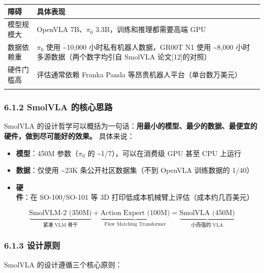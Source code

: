 \documentclass[
  chinese,
]{ctexart}
\providecommand{\tightlist}{%
  \setlength{\itemsep}{0pt}\setlength{\parskip}{0pt}}
\begin{document}
\begin{center}
\begin{tabular}{@{}>{\raggedright\arraybackslash}p{} >{\raggedright\arraybackslash}p{}@{}}
\toprule\noalign{}
障碍 & 具体表现 \\
\midrule\noalign{}
模型规模大 & OpenVLA 7B、\(\pi_0\) 3.3B，训练和推理都需要高端 GPU \\
数据依赖重 & \(\pi_0\) 使用 \textasciitilde10,000 小时私有机器人数据，GR00T N1 使用 \textasciitilde8,000 小时多源数据（两个数字均引自 SmolVLA 论文{[}12{]}的对照） \\
硬件门槛高 & 评估通常依赖 Franka Panda 等昂贵机器人平台（单台数万美元） \\
\bottomrule\noalign{}
\end{tabular}
\end{center}

\subsubsection{6.1.2 SmolVLA
的核心思路}\label{smolvla-ux7684ux6838ux5fc3ux601dux8def}

SmolVLA
的设计哲学可以概括为一句话：\textbf{用最小的模型、最少的数据、最便宜的硬件，做到尽可能好的效果。}
具体来说：

\begin{itemize}
\tightlist
\item
  \textbf{模型}：450M 参数（\(\pi_0\) 的
  \textasciitilde1/7），可以在消费级 GPU 甚至 CPU 上运行
\item
  \textbf{数据}：仅使用 \textasciitilde23K 条公开社区数据集（不到
  OpenVLA 训练数据的 1/40）
\item
  \textbf{硬件}：在 SO-100/SO-101 等 3D
  打印低成本机械臂上评估（成本约几百美元）
\end{itemize}

\[
\underbrace{\text{SmolVLM-2 (350M)}}_{\text{紧凑 VLM 骨干}} + \underbrace{\text{Action Expert (100M)}}_{\text{Flow Matching Transformer}} = \underbrace{\text{SmolVLA (450M)}}_{\text{小而强的 VLA}}
\]

\subsubsection{6.1.3 设计原则}\label{ux8bbeux8ba1ux539fux5219}

SmolVLA 的设计遵循三个核心原则：
\end{document}

